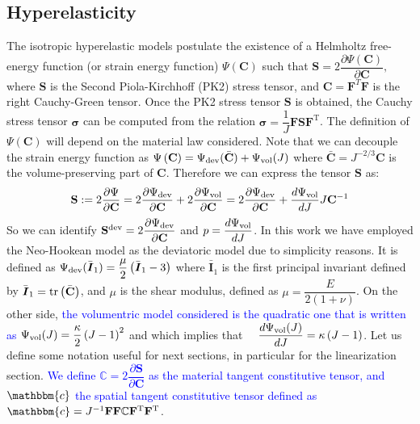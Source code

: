 \documentclass[11pt,english]{article}
\newcommand{\LM}[1]{\textcolor{blue}{#1}}
\def\stress{\boldsymbol{\sigma}}
\def\DevPsi{\Psi_{\rm{dev}}}
\def\VolPsi{\Psi_{\rm{vol}}}
\begin{document}
   \subsection{Hyperelasticity}
   The isotropic hyperelastic models postulate the existence of a Helmholtz free-energy function (or strain energy function) $\Psi \left (\mathbf{C} \right )$  such that $\mathbf{S}=2\dfrac{\partial \Psi \left( \mathbf{C} \right)}{\partial \mathbf{C}},$ where $\mathbf{S}$ is the Second Piola-Kirchhoff (PK2) stress tensor, and $\mathbf{C}=\mathbf{F}^T\mathbf{F}$ is the right Cauchy-Green tensor. Once the PK2 stress tensor $\mathbf{S}$ is obtained, the Cauchy stress tensor $\stress$ can be computed from the relation $\stress = \dfrac{1}{J} \mathbf{F} \mathbf{S} \mathbf{F}^\mathrm{T}$.
The definition of $\Psi \left (\mathbf{C} \right )$ will depend on the material law considered.
Note that we can decouple the  strain energy function as $\Psi \left( \mathbf{C} \right) = \DevPsi(\bar{\mathbf{C}}) + \VolPsi(J)$ where $\bar{\mathbf{C}}=J^{-2/3}\mathbf{C}$ is the volume-preserving part of  $\mathbf{C}$. Therefore we can express the tensor $\mathbf{S}$ as:
    \begin{equation}
        \mathbf{S}:=2\dfrac{\partial \Psi }{\partial\mathbf{C}}=2\dfrac{\partial \DevPsi}{\partial\mathbf{C}}+2\dfrac{\partial \VolPsi}{\partial\mathbf{C}}=2\dfrac{\partial \DevPsi}{\partial\mathbf{C}}+\dfrac{d \VolPsi}{dJ} J \mathbf{C}^{-1} \label{eq:PK2-decomposition}
    \end{equation}
    So we can identify $\mathbf{S}^{\rm{dev}}=2\dfrac{\partial \DevPsi}{\partial\mathbf{C}}$ and $p=\dfrac{d \VolPsi}{dJ}$. In this work we have employed the Neo-Hookean model as the deviatoric model due to simplicity reasons. It is defined as $\DevPsi(\bar{\boldsymbol{I}}_1)=\dfrac{\mu}{2}\left(\bar{\boldsymbol{I}}_1 - 3\right)$
where $\bar{\boldsymbol{I}}_1$ is the first principal invariant defined by $\bar{\boldsymbol{I}}_1=\rm{tr}\left(\bar{\mathbf{C}}\right)$, and $\mu$ is the shear modulus, defined as $\mu=\dfrac{E}{2(1+\nu)}$.
On the other side, \LM{ the volumentric model considered is the quadratic one \cite{horgan2009volumetric} that is written as} $\VolPsi(J)=\dfrac{\kappa}{2} \left( J -1\right)^2$ and which implies that $ \quad \dfrac{d\VolPsi(J)}{dJ}=\kappa \left(J - 1 \right)$.
Let us define some notation useful for next sections, in particular for the linearization section. \LM{We define $\mathbb{C}=2\dfrac{\partial \mathbf{S}}{\partial \mathbf{C}}$ as the material tangent constitutive tensor, and $\mathbbm{c}$ the spatial tangent constitutive tensor defined as $\mathbbm{c}=J^{-1} \mathbf{F} \mathbf{F} \mathbb{C} \mathbf{F}^{\rm{T}}  \mathbf{F}^{\rm{T}}$}.
\end{document}

